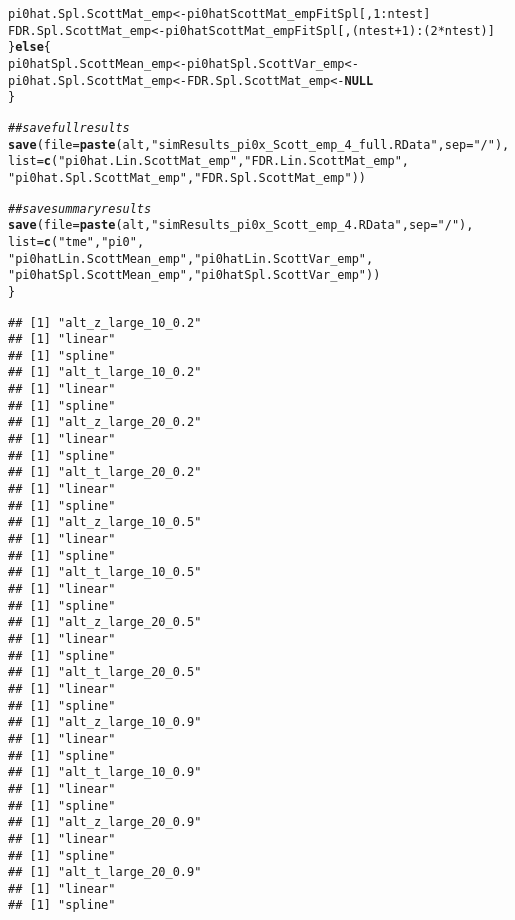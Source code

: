 \documentclass{article}\usepackage[]{graphicx}\usepackage[]{color}
\makeatletter
\newcommand{\hlnum}[1]{\textcolor[rgb]{0.686,0.059,0.569}{#1}}%
\newcommand{\hlstr}[1]{\textcolor[rgb]{0.192,0.494,0.8}{#1}}%
\newcommand{\hlcom}[1]{\textcolor[rgb]{0.678,0.584,0.686}{\textit{#1}}}%
\newcommand{\hlopt}[1]{\textcolor[rgb]{0,0,0}{#1}}%
\newcommand{\hlstd}[1]{\textcolor[rgb]{0.345,0.345,0.345}{#1}}%
\newcommand{\hlkwa}[1]{\textcolor[rgb]{0.161,0.373,0.58}{\textbf{#1}}}%
\newcommand{\hlkwb}[1]{\textcolor[rgb]{0.69,0.353,0.396}{#1}}%
\newcommand{\hlkwc}[1]{\textcolor[rgb]{0.333,0.667,0.333}{#1}}%
\newcommand{\hlkwd}[1]{\textcolor[rgb]{0.737,0.353,0.396}{\textbf{#1}}}%
\newenvironment{kframe}{%
 \def\at@end@of@kframe{}%
 \ifinner\ifhmode%
  \def\at@end@of@kframe{\end{minipage}}%
  \begin{minipage}{\columnwidth}%
 \fi\fi%
 \def\FrameCommand##1{\hskip\@totalleftmargin \hskip-\fboxsep
 \colorbox{shadecolor}{##1}\hskip-\fboxsep
     \hskip-\linewidth \hskip-\@totalleftmargin \hskip\columnwidth}%
 \MakeFramed {\advance\hsize-\width
   \@totalleftmargin\z@ \linewidth\hsize
   \@setminipage}}%
 {\par\unskip\endMakeFramed%
 \at@end@of@kframe}
\newenvironment{knitrout}{}{} %
\makeatother
\begin{document}
\begin{knitrout}
\begin{kframe}
\begin{alltt}
    \hlstd{pi0hat.Spl.ScottMat_emp} \hlkwb{<-} \hlstd{pi0hatScottMat_empFitSpl[,}\hlnum{1}\hlopt{:}\hlstd{ntest]}
    \hlstd{FDR.Spl.ScottMat_emp} \hlkwb{<-} \hlstd{pi0hatScottMat_empFitSpl[,(ntest}\hlopt{+}\hlnum{1}\hlstd{)}\hlopt{:}\hlstd{(}\hlnum{2}\hlopt{*}\hlstd{ntest)]}
  \hlstd{\}} \hlkwa{else} \hlstd{\{}
    \hlstd{pi0hatSpl.ScottMean_emp} \hlkwb{<-} \hlstd{pi0hatSpl.ScottVar_emp} \hlkwb{<-}
      \hlstd{pi0hat.Spl.ScottMat_emp} \hlkwb{<-} \hlstd{FDR.Spl.ScottMat_emp} \hlkwb{<-} \hlkwa{NULL}
  \hlstd{\}}

  \hlcom{##save full results}
  \hlkwd{save}\hlstd{(}\hlkwc{file}\hlstd{=}\hlkwd{paste}\hlstd{(alt,}\hlstr{"simResults_pi0x_Scott_emp_4_full.RData"}\hlstd{,}\hlkwc{sep}\hlstd{=}\hlstr{"/"}\hlstd{),}
       \hlkwc{list}\hlstd{=}\hlkwd{c}\hlstd{(}\hlstr{"pi0hat.Lin.ScottMat_emp"}\hlstd{,} \hlstr{"FDR.Lin.ScottMat_emp"}\hlstd{,}
              \hlstr{"pi0hat.Spl.ScottMat_emp"}\hlstd{,} \hlstr{"FDR.Spl.ScottMat_emp"}\hlstd{))}

  \hlcom{##save summary results}
  \hlkwd{save}\hlstd{(}\hlkwc{file}\hlstd{=}\hlkwd{paste}\hlstd{(alt,}\hlstr{"simResults_pi0x_Scott_emp_4.RData"}\hlstd{,}\hlkwc{sep}\hlstd{=}\hlstr{"/"}\hlstd{),}
       \hlkwc{list}\hlstd{=}\hlkwd{c}\hlstd{(}\hlstr{"tme"}\hlstd{,} \hlstr{"pi0"}\hlstd{,}
              \hlstr{"pi0hatLin.ScottMean_emp"}\hlstd{,} \hlstr{"pi0hatLin.ScottVar_emp"}\hlstd{,}
              \hlstr{"pi0hatSpl.ScottMean_emp"}\hlstd{,} \hlstr{"pi0hatSpl.ScottVar_emp"}\hlstd{))}
\hlstd{\}}
\end{alltt}
\begin{verbatim}
## [1] "alt_z_large_10_0.2"
## [1] "linear"
## [1] "spline"
## [1] "alt_t_large_10_0.2"
## [1] "linear"
## [1] "spline"
## [1] "alt_z_large_20_0.2"
## [1] "linear"
## [1] "spline"
## [1] "alt_t_large_20_0.2"
## [1] "linear"
## [1] "spline"
## [1] "alt_z_large_10_0.5"
## [1] "linear"
## [1] "spline"
## [1] "alt_t_large_10_0.5"
## [1] "linear"
## [1] "spline"
## [1] "alt_z_large_20_0.5"
## [1] "linear"
## [1] "spline"
## [1] "alt_t_large_20_0.5"
## [1] "linear"
## [1] "spline"
## [1] "alt_z_large_10_0.9"
## [1] "linear"
## [1] "spline"
## [1] "alt_t_large_10_0.9"
## [1] "linear"
## [1] "spline"
## [1] "alt_z_large_20_0.9"
## [1] "linear"
## [1] "spline"
## [1] "alt_t_large_20_0.9"
## [1] "linear"
## [1] "spline"
\end{verbatim}
\end{kframe}
\end{knitrout}
\end{document}
